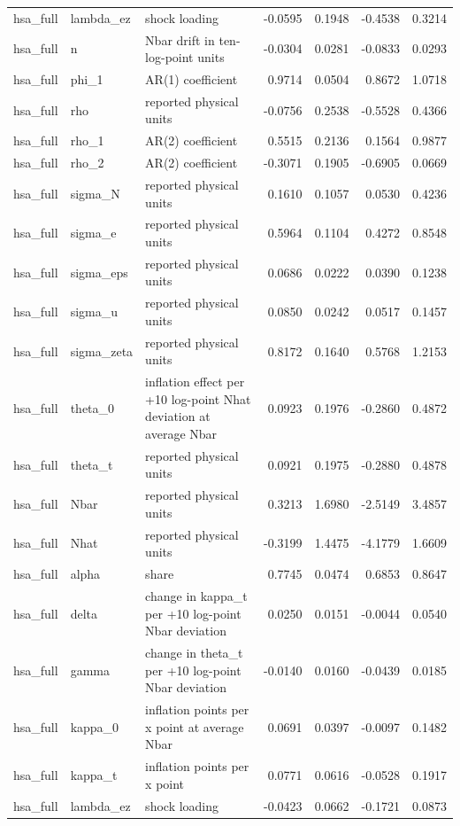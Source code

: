 \begin{tabular}{lllrrrr}
hsa\_full & lambda\_ez & shock loading & -0.0595 & 0.1948 & -0.4538 & 0.3214 \\
hsa\_full & n & Nbar drift in ten-log-point units & -0.0304 & 0.0281 & -0.0833 & 0.0293 \\
hsa\_full & phi\_1 & AR(1) coefficient & 0.9714 & 0.0504 & 0.8672 & 1.0718 \\
hsa\_full & rho & reported physical units & -0.0756 & 0.2538 & -0.5528 & 0.4366 \\
hsa\_full & rho\_1 & AR(2) coefficient & 0.5515 & 0.2136 & 0.1564 & 0.9877 \\
hsa\_full & rho\_2 & AR(2) coefficient & -0.3071 & 0.1905 & -0.6905 & 0.0669 \\
hsa\_full & sigma\_N & reported physical units & 0.1610 & 0.1057 & 0.0530 & 0.4236 \\
hsa\_full & sigma\_e & reported physical units & 0.5964 & 0.1104 & 0.4272 & 0.8548 \\
hsa\_full & sigma\_eps & reported physical units & 0.0686 & 0.0222 & 0.0390 & 0.1238 \\
hsa\_full & sigma\_u & reported physical units & 0.0850 & 0.0242 & 0.0517 & 0.1457 \\
hsa\_full & sigma\_zeta & reported physical units & 0.8172 & 0.1640 & 0.5768 & 1.2153 \\
hsa\_full & theta\_0 & inflation effect per +10 log-point Nhat deviation at average Nbar & 0.0923 & 0.1976 & -0.2860 & 0.4872 \\
hsa\_full & theta\_t & reported physical units & 0.0921 & 0.1975 & -0.2880 & 0.4878 \\
hsa\_full & Nbar & reported physical units & 0.3213 & 1.6980 & -2.5149 & 3.4857 \\
hsa\_full & Nhat & reported physical units & -0.3199 & 1.4475 & -4.1779 & 1.6609 \\
hsa\_full & alpha & share & 0.7745 & 0.0474 & 0.6853 & 0.8647 \\
hsa\_full & delta & change in kappa\_t per +10 log-point Nbar deviation & 0.0250 & 0.0151 & -0.0044 & 0.0540 \\
hsa\_full & gamma & change in theta\_t per +10 log-point Nbar deviation & -0.0140 & 0.0160 & -0.0439 & 0.0185 \\
hsa\_full & kappa\_0 & inflation points per x point at average Nbar & 0.0691 & 0.0397 & -0.0097 & 0.1482 \\
hsa\_full & kappa\_t & inflation points per x point & 0.0771 & 0.0616 & -0.0528 & 0.1917 \\
hsa\_full & lambda\_ez & shock loading & -0.0423 & 0.0662 & -0.1721 & 0.0873 \\

\end{tabular}

